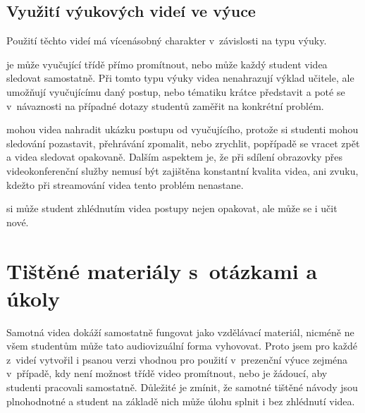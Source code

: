 \subsection{Využití výukových videí ve výuce}
Použití těchto videí má vícenásobný charakter v~závislosti na typu výuky.

\noindent{} je může vyučující třídě přímo promítnout, nebo může každý student videa sledovat samostatně. Při tomto typu výuky videa nenahrazují výklad učitele, ale umožňují vyučujícímu daný postup, nebo tématiku krátce představit a poté se v~návaznosti na případné dotazy studentů zaměřit na konkrétní problém.

\noindent{} mohou videa nahradit ukázku postupu od vyučujícího, protože si studenti mohou sledování pozastavit, přehrávání zpomalit, nebo zrychlit, popřípadě se vracet zpět a videa sledovat opakovaně. Dalším aspektem je, že při sdílení obrazovky přes videokonferenční služby nemusí být zajištěna konstantní kvalita videa, ani zvuku, kdežto při streamování videa tento problém nenastane. 

\noindent{} si může student zhlédnutím videa postupy nejen opakovat, ale může se i učit nové. 

\section{Tištěné materiály s~otázkami a úkoly}
Samotná videa dokáží samostatně fungovat jako vzdělávací materiál, nicméně ne všem studentům může tato audiovizuální forma vyhovovat.
Proto jsem pro každé z~videí vytvořil i psanou verzi vhodnou pro použití v~prezenční výuce zejména v~případě, kdy není možnost třídě video promítnout, nebo je žádoucí, aby studenti pracovali samostatně. 
Důležité je zmínit, že samotné tištěné návody jsou plnohodnotné a student na základě nich může úlohu splnit i bez zhlédnutí videa. 

